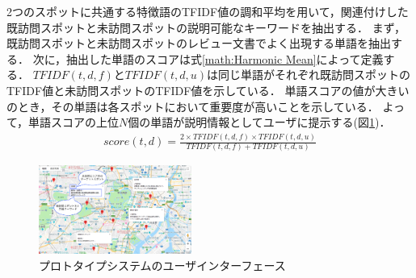 \documentclass[submit]{ipsj}
\begin{document}
2つのスポットに共通する特徴語のTFIDF値の調和平均を用いて，関連付けした既訪問スポットと未訪問スポットの説明可能なキーワードを抽出する．
まず，既訪問スポットと未訪問スポットのレビュー文書でよく出現する単語を抽出する．
次に，抽出した単語のスコアは式\ref{math:Harmonic Mean}によって定義する．
$TFIDF(t,d,f)$と$TFIDF(t,d,u)$は同じ単語がそれぞれ既訪問スポットのTFIDF値と未訪問スポットのTFIDF値を示している．
単語スコアの値が大きいのとき，その単語は各スポットにおいて重要度が高いことを示している．
よって，単語スコアの上位$N$個の単語が説明情報としてユーザに提示する(図\ref{fig:Photo_Map})．
\begin{eqnarray}
  score(t,d) = \frac{2 \times TFIDF(t,d,f) \times TFIDF(t,d,u)}{TFIDF(t,d,f) + TFIDF(t,d,u)}
  \label{math:Harmonic Mean}
\end{eqnarray}

\begin{figure}[t]
  \begin{center}
    \includegraphics[clip,width=5.0cm]{picture/Photo_Map2_jap.png}
    \caption{プロトタイプシステムのユーザインターフェース}
    \label{fig:Photo_Map}
   \end{center}
\end{figure}
\end{document}

